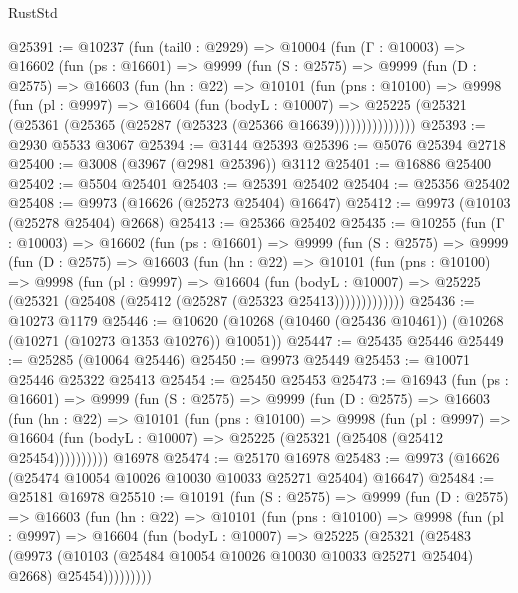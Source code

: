 \begin{lexlean}{RustStd}
\begin{coremodule}
@25391 := @10237
    (fun (tail0 : @2929) =>
    @10004
      (fun (Γ : @10003) =>
      @16602
        (fun (ps : @16601) =>
        @9999
          (fun (S : @2575) =>
          @9999
            (fun (D : @2575) =>
            @16603
              (fun (hn : @22) =>
              @10101
                (fun (pns : @10100) =>
                @9998
                  (fun (pl : @9997) =>
                  @16604
                    (fun (bodyL : @10007) =>
                    @25225 (@25321 (@25361 (@25365 (@25287 (@25323 (@25366 @16639)))))))))))))))
@25393 := @2930 @5533 @3067
@25394 := @3144 @25393
@25396 := @5076 @25394 @2718
@25400 := @3008 (@3967 (@2981 @25396)) @3112
@25401 := @16886 @25400
@25402 := @5504 @25401
@25403 := @25391 @25402
@25404 := @25356 @25402
@25408 := @9973 (@16626 (@25273 @25404) @16647)
@25412 := @9973 (@10103 (@25278 @25404) @2668)
@25413 := @25366 @25402
@25435 := @10255
    (fun (Γ : @10003) =>
    @16602
      (fun (ps : @16601) =>
      @9999
        (fun (S : @2575) =>
        @9999
          (fun (D : @2575) =>
          @16603
            (fun (hn : @22) =>
            @10101
              (fun (pns : @10100) =>
              @9998
                (fun (pl : @9997) =>
                @16604
                  (fun (bodyL : @10007) =>
                  @25225 (@25321 (@25408 (@25412 (@25287 (@25323 @25413)))))))))))))
@25436 := @10273 @1179
@25446 := @10620 (@10268 (@10460 (@25436 @10461)) (@10268 (@10271 (@10273 @1353 @10276)) @10051))
@25447 := @25435 @25446
@25449 := @25285 (@10064 @25446)
@25450 := @9973 @25449
@25453 := @10071 @25446 @25322 @25413
@25454 := @25450 @25453
@25473 := @16943
    (fun (ps : @16601) =>
    @9999
      (fun (S : @2575) =>
      @9999
        (fun (D : @2575) =>
        @16603
          (fun (hn : @22) =>
          @10101
            (fun (pns : @10100) =>
            @9998
              (fun (pl : @9997) =>
              @16604 (fun (bodyL : @10007) => @25225 (@25321 (@25408 (@25412 @25454))))))))))
    @16978
@25474 := @25170 @16978
@25483 := @9973 (@16626 (@25474 @10054 @10026 @10030 @10033 @25271 @25404) @16647)
@25484 := @25181 @16978
@25510 := @10191
    (fun (S : @2575) =>
    @9999
      (fun (D : @2575) =>
      @16603
        (fun (hn : @22) =>
        @10101
          (fun (pns : @10100) =>
          @9998
            (fun (pl : @9997) =>
            @16604
              (fun (bodyL : @10007) =>
              @25225
                (@25321
                  (@25483
                    (@9973
                      (@10103 (@25484 @10054 @10026 @10030 @10033 @25271 @25404) @2668)
                      @25454)))))))))

\end{coremodule}
\end{lexlean}
